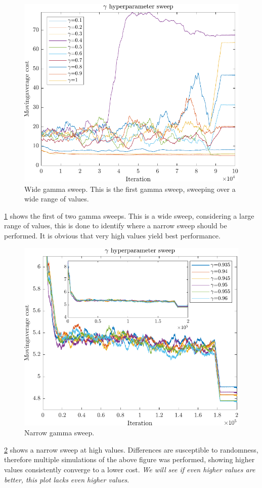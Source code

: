 \newpage
\clearpage

\begin{figure}[h!]
	\centering
	\includegraphics[width=0.7\linewidth]{figures/GammaSweepApproxWide.pdf}
	\caption{Wide gamma sweep. This is the first gamma sweep, sweeping over a wide range of values.}
	\label{fig:WideGammaSweep}
\end{figure} 

\cref{fig:WideGammaSweep} shows the first of two gamma sweeps. This is a wide sweep, considering a large range of values, this is done to identify where a narrow sweep should be performed. It is obvious that very high values yield best performance.

\begin{figure}[h!]
	\centering
	\includegraphics[width=0.7\linewidth]{figures/GammaSweepApproxNarrow.pdf}
	\caption{Narrow gamma sweep.}
	\label{fig:NarrowGammaSweep}
\end{figure} 

\cref{fig:NarrowGammaSweep} shows a narrow sweep at high values. Differences are susceptible to randomness, therefore multiple simulations of the above figure was performed, showing higher values consistently converge to a lower cost. \textit{We will see if even higher values are better, this plot lacks even higher values}.


